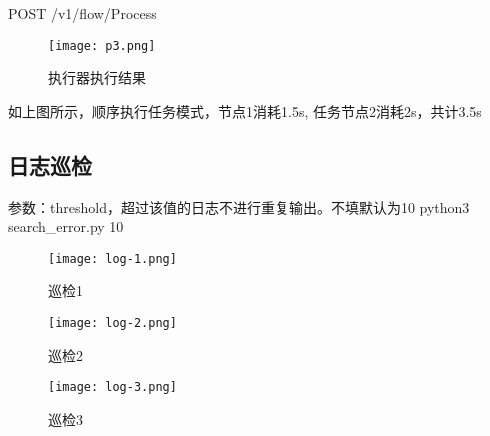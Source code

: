 POST /v1/flow/Process

\begin{figure}[H]
    \centering
    \texttt{[image: p3.png]}
    \caption{执行器执行结果}
    \label{fig:6-3-3}
\end{figure}

如上图所示，顺序执行任务模式，节点1消耗1.5s, 任务节点2消耗2s，共计3.5s








\subsection{日志巡检}

参数：threshold，超过该值的日志不进行重复输出。不填默认为10
python3 search\_error.py 10

\begin{figure}
    \centering
    \texttt{[image: log-1.png]}
    \caption{巡检1}
    \label{fig:6-4-1}
\end{figure}

\begin{figure}
    \centering
    \texttt{[image: log-2.png]}
    \caption{巡检2}
    \label{fig:6-4-2}
\end{figure}

\begin{figure}
    \centering
    \texttt{[image: log-3.png]}
    \caption{巡检3}
    \label{fig:6-4-3}
\end{figure}

